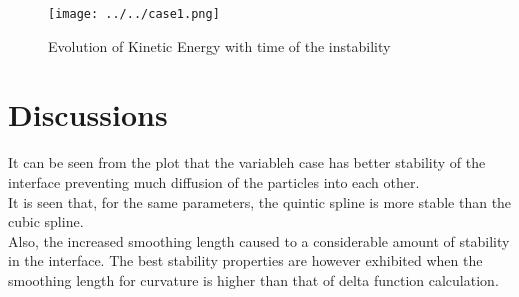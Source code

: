 \begin{figure}[H]
\centering
\texttt{[image: ../../case1.png]}
\caption{Evolution of Kinetic Energy with time of the instability}
\end{figure}


\section{Discussions}

It can be seen from the plot that the variableh case has better stability of the interface preventing much diffusion of the particles into each other.\\

It is seen that, for the same parameters, the quintic spline is more stable than the cubic spline.\\

Also, the increased smoothing length caused to a considerable amount of stability in the interface. The best stability properties are however exhibited when the smoothing length for curvature is higher than that of delta function calculation.

